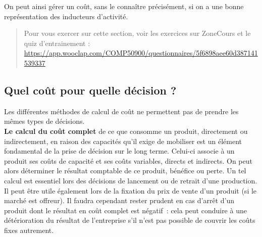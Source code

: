 \documentclass{tufte-handout}
\begin{document}
\begin{enumerate}
On peut ainsi gérer un coût, sans le connaître précisément, si on a une bonne représentation des inducteurs d'activité.\\

\begin{quote}
Pour vous exercer sur cette section, voir les exercices sur ZoneCours et le quiz d'entrainement : \url{https://app.wooclap.com/COMP50900/questionnaires/5f6898aee60d387141539337}\\
\end{quote}
\end{enumerate}

\subsection{Quel coût pour quelle décision ?}
\label{sec:org86d3066}
Les différentes méthodes de calcul de coût ne permettent pas de prendre les mêmes types de décisions.\\

\textbf{Le calcul du coût complet} de ce que consomme un produit, directement ou indirectement, en raison des capacités qu'il exige de mobiliser est un élément fondamental de la prise de décision sur le long terme. Celui-ci associe à un produit ses coûts de capacité et ses coûts variables, directs et indirects. On peut alors déterminer le résultat comptable de ce produit, bénéfice ou perte. Un tel calcul est essentiel lors des décisions de lancement ou de retrait d'une production. Il peut être utile également lors de la fixation du prix de vente d'un produit (si le marché est offreur). Il faudra cependant rester prudent en cas d'arrêt d'un produit dont le résultat en coût complet est négatif : cela peut conduire à une détérioration du résultat de l'entreprise s'il n'est pas possible de couvrir les coûts fixes autrement.\\
\end{document}
